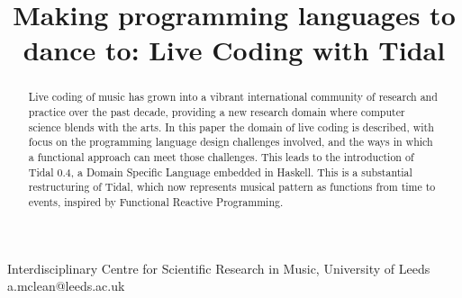 \documentclass[authoryear]{sigplanconf}
\begin{document}
\setlength{\pdfpageheight}{\paperheight}
\setlength{\pdfpagewidth}{\paperwidth}







\title{Making programming languages to dance to: Live Coding with Tidal}

           {Interdisciplinary Centre for Scientific Research in Music, University of Leeds}
           {a.mclean@leeds.ac.uk}

\maketitle

\begin{abstract}

Live coding of music has grown into a vibrant international community
of research and practice over the past decade, providing a new
research domain where computer science blends with the arts. In this
paper the domain of live coding is described, with focus on the
programming language design challenges involved, and the ways in which
a functional approach can meet those challenges. This leads to the
introduction of Tidal 0.4, a Domain Specific Language embedded in
Haskell. This is a substantial restructuring of Tidal, which now
represents musical pattern as functions from time to events, inspired
by Functional Reactive Programming.

\end{abstract}

\end{document}
